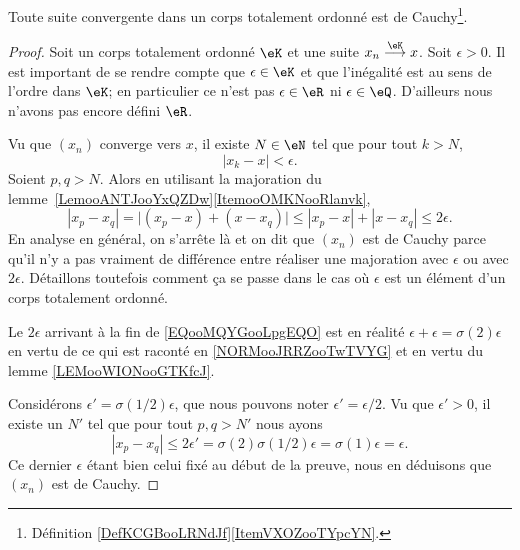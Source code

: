 \begin{proposition}     \label{PROPooTFVOooFoSHPg}
	Toute suite convergente dans un corps totalement ordonné est de Cauchy\footnote{Définition \ref{DefKCGBooLRNdJf}\ref{ItemVXOZooTYpcYN}.}.
\end{proposition}

\begin{proof}
	Soit un corps totalement ordonné \( \eK\) et une suite \( x_n\stackrel{\eK}{\longrightarrow}x\). Soit \( \epsilon>0\). Il est important de se rendre compte que \( \epsilon\in \eK\) et que l'inégalité est au sens de l'ordre dans \( \eK\); en particulier ce n'est pas \( \epsilon\in \eR\) ni \( \epsilon\in \eQ\). D'ailleurs nous n'avons pas encore défini \( \eR\).

	Vu que \( (x_n)\) converge vers \( x\), il existe \( N\in \eN\) tel que pour tout \( k>N\),
	\begin{equation}
		| x_k-x |<\epsilon.
	\end{equation}
	Soient \( p,q>N\). Alors en utilisant la majoration du lemme~\ref{LemooANTJooYxQZDw}\ref{ItemooOMKNooRlanvk},
	\begin{equation}        \label{EQooMQYGooLpgEQO}
		| x_p-x_q |=\big| (x_p-x)+(x-x_q) \big|\leq | x_p-x |+| x-x_q |\leq 2\epsilon.
	\end{equation}
	En analyse en général, on s'arrête là et on dit que \( (x_n)\) est de Cauchy parce qu'il n'y a pas vraiment de différence entre réaliser une majoration avec \( \epsilon\) ou avec \( 2\epsilon\). Détaillons toutefois comment ça se passe dans le cas où \( \epsilon\) est un élément d'un corps totalement ordonné.

	Le \( 2\epsilon\) arrivant à la fin de \eqref{EQooMQYGooLpgEQO} est en réalité \( \epsilon+\epsilon=\sigma(2)\epsilon\) en vertu de ce qui est raconté en \ref{NORMooJRRZooTwTVYG} et en vertu du lemme \ref{LEMooWIONooGTKfcJ}.

	Considérons \( \epsilon'=\sigma(1/2)\epsilon\), que nous pouvons noter \( \epsilon'=\epsilon/2\). Vu que \( \epsilon'>0\), il existe un \( N'\) tel que pour tout \( p,q>N'\) nous ayons
	\begin{equation}
		| x_p-x_q |\leq 2\epsilon'=\sigma(2)\sigma(1/2)\epsilon=\sigma(1)\epsilon=\epsilon.
	\end{equation}
	Ce dernier \( \epsilon\) étant bien celui fixé au début de la preuve, nous en déduisons que \( (x_n)\) est de Cauchy.
\end{proof}


